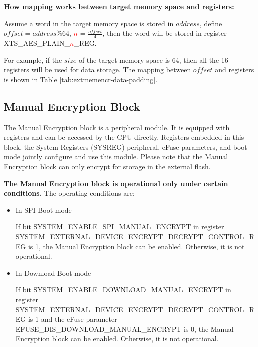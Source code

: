 \documentclass[main\_\_EN.tex]{subfiles}
\begin{document}
{\bfseries How mapping works between target memory space and registers:}

Assume a word in the target memory space is stored in \begin{math} address \end{math}, define \begin{math} offset = address \% 64 \end{math}, \textcolor{red}{\it{$n$}} =  \begin{math} \frac{offset}{4} \end{math}, then the word will be stored in register XTS\_AES\_PLAIN\_\textcolor{red}{\it{$n$}}\_REG.

For example, if the \begin{math} size \end{math} of the target memory space is 64, then all the 16 registers will be used for data storage. The mapping between \begin{math} offset \end{math} and registers is shown in Table \ref{tab:extmemencr-data-padding}.



\subsection{Manual Encryption Block}

The Manual Encryption block is a peripheral module. It is equipped with registers and can be accessed by the CPU directly. Registers embedded in this block, the System Registers (SYSREG) peripheral, eFuse parameters, and boot mode jointly configure and use this module. Please note that the Manual Encryption block can only encrypt for storage in the external flash.

\textbf{ The Manual Encryption block is operational only under certain conditions.} The operating conditions are:

\begin{itemize}

    \item In SPI Boot mode

    If bit SYSTEM\_ENABLE\_SPI\_MANUAL\_ENCRYPT in register SYSTEM\_EXTERNAL\_DEVICE\_ENCRYPT\_DECRYPT\_CONTROL\_REG is 1, the Manual Encryption block can be enabled. Otherwise, it is not operational.

    \item In Download Boot mode

    If bit SYSTEM\_ENABLE\_DOWNLOAD\_MANUAL\_ENCRYPT in register SYSTEM\_EXTERNAL\_DEVICE\_ENCRYPT\_DECRYPT\_CONTROL\_REG is 1 and the eFuse parameter EFUSE\_DIS\_DOWNLOAD\_MANUAL\_ENCRYPT is 0, the Manual Encryption block can be enabled. Otherwise, it is not operational.

\end{itemize}
\end{document}
